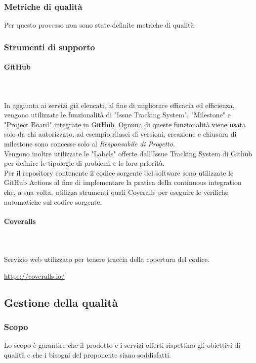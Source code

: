 \subsubsection{Metriche di qualità}
Per questo processo non sono state definite metriche di qualità.

\subsubsection{Strumenti di supporto}
\paragraph{GitHub}\mbox{} \\ \mbox{} \\
In aggiunta ai servizi già elencati, al fine di migliorare efficacia ed efficienza, vengono utilizzate le funzionalità di "Issue Tracking System", "Milestone" e "Project Board" integrate in GitHub. Ognuna di queste funzionalità viene usata solo da chi autorizzato, ad esempio rilasci di versioni, creazione e chiusura di milestone sono concesse solo al \textit{Responsabile di Progetto}.\\
Vengono inoltre utilizzate le "Labels" offerte dall’Issue Tracking System di Github per definire le tipologie di problemi e le loro priorità.\\
Per il repository contenente il codice sorgente del software sono utilizzate le GitHub Actions al fine di implementare la pratica della continuous integration che, a sua volta, utilizza strumenti quali Coveralls per eseguire le verifiche automatiche sul codice sorgente.

\paragraph{Coveralls}\mbox{} \\ \mbox{} \\
Servizio web utilizzato per tenere traccia della copertura del codice.\\
	\centerline{\url{https://coveralls.io/}}

\subsection{Gestione della qualità}
\subsubsection{Scopo}
Lo scopo è garantire che il prodotto e i servizi offerti rispettino gli obiettivi di qualità e che i bisogni del proponente siano soddisfatti. 

